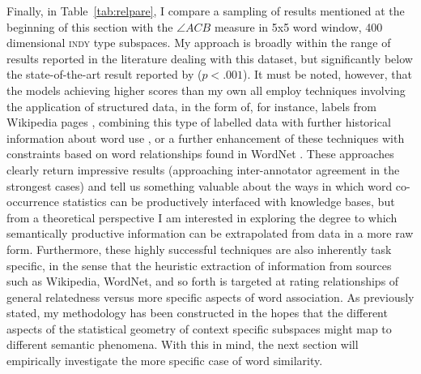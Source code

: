 Finally, in Table~\ref{tab:relpare}, I compare a sampling of results mentioned at the beginning of this section with the $\angle ACB$ measure in 5x5 word window, 400 dimensional \textsc{indy} type subspaces.  My approach is broadly within the range of results reported in the literature dealing with this dataset, but significantly below the state-of-the-art result reported by \cite{HalawiEA2012} ($p < .001$).  It must be noted, however, that the models achieving higher scores than my own all employ techniques involving the application of structured data, in the form of, for instance, labels from Wikipedia pages \citep{GabrilovichEA2007}, combining this type of labelled data with further historical information about word use \citep{RadinskyEA2011}, or a further enhancement of these techniques with constraints based on word relationships found in WordNet \citep{HalawiEA2012}.  These approaches clearly return impressive results (approaching inter-annotator agreement in the strongest cases) and tell us something valuable about the ways in which word co-occurrence statistics can be productively interfaced with knowledge bases, but from a theoretical perspective I am interested in exploring the degree to which semantically productive information can be extrapolated from data in a more raw form.  Furthermore, these highly successful techniques are also inherently task specific, in the sense that the heuristic extraction of information from sources such as Wikipedia, WordNet, and so forth is targeted at rating relationships of general relatedness versus more specific aspects of word association.  As previously stated, my methodology has been constructed in the hopes that the different aspects of the statistical geometry of context specific subspaces might map to different semantic phenomena.  With this in mind, the next section will empirically investigate the more specific case of word similarity.


